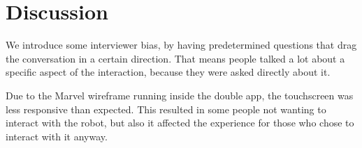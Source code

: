 \section{Discussion}
\label{Discussion}
%
We introduce some interviewer bias, by having predetermined questions that drag the conversation in a certain direction. That means people talked a lot about a specific aspect of the interaction, because they were asked directly about it.

Due to the Marvel wireframe running inside the double app, the touchscreen was less responsive than expected. This resulted in some people not wanting to interact with the robot, but also it affected the experience for those who chose to interact with it anyway. 
